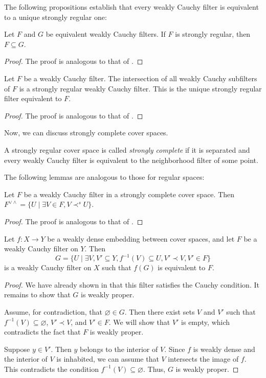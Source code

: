 \documentclass[reqno]{amsart}
\theoremstyle{definition}
\theoremstyle{remark}
\numberwithin{figure}{section}
\newcommand{\rb}{\prec}
\begin{document}
The following propositions establish that every weakly Cauchy filter is equivalent to a unique strongly regular one:

\begin{prop}
Let $F$ and $G$ be equivalent weakly Cauchy filters.
If $F$ is strongly regular, then $F \subseteq G$.
\end{prop}
\begin{proof}
The proof is analogous to that of .
\end{proof}

\begin{prop}
Let $F$ be a weakly Cauchy filter.
The intersection of all weakly Cauchy subfilters of $F$ is a strongly regular weakly Cauchy filter.
This is the unique strongly regular filter equivalent to $F$.
\end{prop}
\begin{proof}
The proof is analogous to that of .
\end{proof}

Now, we can discuss strongly complete cover spaces.

\begin{defn}
A strongly regular cover space is called \emph{strongly complete} if it is separated and every weakly Cauchy filter is equivalent to the neighborhood filter of some point.
\end{defn}

The following lemmas are analogous to those for regular spaces:

\begin{lem}
Let $F$ be a weakly Cauchy filter in a strongly complete cover space.
Then $F^{\vee \wedge} = \{ U \mid \exists V \in F, V \rb^s U \}$.
\end{lem}
\begin{proof}
The proof is analogous to that of .
\end{proof}

\begin{lem}
Let $f : X \to Y$ be a weakly dense embedding between cover spaces, and let $F$ be a weakly Cauchy filter on $Y$.  
Then
\[ G = \{ U \mid \exists V,V' \subseteq Y, f^{-1}(V) \subseteq U, V' \rb V, V' \in F \} \]
is a weakly Cauchy filter on $X$ such that $f(G)$ is equivalent to $F$.
\end{lem}
\begin{proof}
We have already shown in  that this filter satisfies the Cauchy condition.  
It remains to show that $G$ is weakly proper.  

Assume, for contradiction, that $\varnothing \in G$.  
Then there exist sets $V$ and $V'$ such that $f^{-1}(V) \subseteq \varnothing$, $V' \rb V$, and $V' \in F$.  
We will show that $V'$ is empty, which contradicts the fact that $F$ is weakly proper.  

Suppose $y \in V'$.
Then $y$ belongs to the interior of $V$.  
Since $f$ is weakly dense and the interior of $V$ is inhabited, we can assume that $V$ intersects the image of $f$.  
This contradicts the condition $f^{-1}(V) \subseteq \varnothing$.  
Thus, $G$ is weakly proper.
\end{proof}
\end{document}
